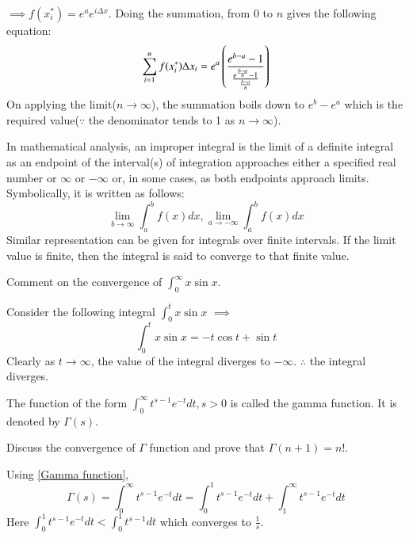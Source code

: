 \documentclass[journal,12pt,twocolumn]{IEEEtran}
\begin{document}
$\implies f(x^*_i)=e^{a}e^{i\Delta x}$. Doing the summation, from 0 to $n$ gives the following equation:
\begin{equation}
\sum_{i=1}^{n}f(x^*_i)\Delta x_i=e^a\left(\frac{e^{b-a}-1}{\frac{e^{\frac{b-a}{n}}-1}{\frac{b-a}{n}}}\right)
\end{equation}
On applying the limit($n \to \infty$), the summation boils down to $e^b-e^a$ which is the required value($\because$ the denominator tends to 1 as $n \to \infty$).
\begin{definition}
\label{Improper Integrals and convergence}
In mathematical analysis, an improper integral is the limit of a definite integral as an endpoint of the interval(s) of integration approaches either a specified real number or $\infty$ or $-\infty$ or, in some cases, as both endpoints approach limits.
Symbolically, it is written as follows:
\begin{equation}
\lim_{b \to \infty}\int_{a}^{b}f(x) dx, \lim_{a \to -\infty}\int_{a}^{b}f(x) dx
\end{equation}
Similar representation can be given for integrals over finite intervals. If the limit value is finite, then the integral is said to converge to that finite value. 
\end{definition}
\begin{problem}
Comment on the convergence of $\int_{0}^{\infty}x \sin x$.
\end{problem}
\solution
Consider the following integral $\int_{0}^{t}x \sin x$
$\implies$\begin{equation}
\int_{0}^{t}x \sin x = -t\cos t + \sin t
\end{equation} 
Clearly as $t \to \infty$, the value of the integral diverges to $-\infty$. $\therefore$ the integral diverges.
\begin{proposition}
\label{Gamma function}
The function of the form $\int_{0}^{\infty}t^{s-1} e^{-t} dt, s>0$ is called the gamma function. It is denoted by $\Gamma(s)$.
\end{proposition}
\begin{problem}
Discuss the convergence of $\Gamma$ function and prove that $\Gamma(n+1)=n!$.
\end{problem}
\solution
Using \ref{Gamma function}, 
\begin{equation}
\Gamma(s)=\int_{0}^{\infty}t^{s-1} e^{-t} dt=\int_{0}^{1}t^{s-1} e^{-t} dt+\int_{1}^{\infty}t^{s-1} e^{-t} dt
\end{equation}
Here $\int_{0}^{1}t^{s-1} e^{-t} dt < \int_{0}^{1}t^{s-1} dt$ which converges to $\frac{1}{s}$.
\end{document}
